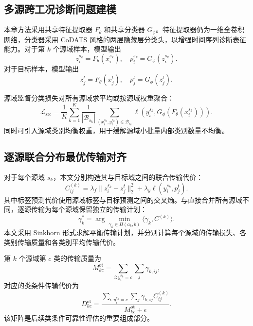\documentclass{seuthesis-2022}
\begin{document}
\subsection{多源跨工况诊断问题建模}

本章方法采用共享特征提取器 $F_\theta$ 和共享分类器 $G_\phi$。特征提取器仍为一维全卷积网络，分类器采用 CoDATS 风格的两层隐藏层分类头，以增强时间序列诊断表征能力。对于第 $k$ 个源域样本，模型输出
\begin{equation}
    z_i^{s_k}=F_\theta(x_i^{s_k}),\quad
    p_i^{s_k}=G_\phi(z_i^{s_k}).
\end{equation}
对于目标样本，模型输出
\begin{equation}
    z_j^t=F_\theta(x_j^t),\quad
    p_j^t=G_\phi(z_j^t).
\end{equation}

源域监督分类损失对所有源域求平均或按源域权重聚合：
\begin{equation}
    \mathcal{L}_{\mathrm{src}}
    =
    \frac{1}{K}
    \sum_{k=1}^{K}
    \frac{1}{|\mathcal{B}_{s_k}|}
    \sum_{(x_i^{s_k},y_i^{s_k})\in\mathcal{B}_{s_k}}
    \ell
    \left(
    y_i^{s_k},
    G_\phi(F_\theta(x_i^{s_k}))
    \right).
\end{equation}
同时可引入源域类别均衡权重，用于缓解源域小批量内部类别数量不均衡。

\subsection{逐源联合分布最优传输对齐}

对于每个源域 $s_k$，本文分别构造其与目标域之间的联合传输代价：
\begin{equation}
    C_{ij}^{(k)}
    =
    \lambda_f
    \|z_i^{s_k}-z_j^t\|_2^2
    +
    \lambda_y
    \ell
    \left(
    y_i^{s_k},
    p_j^t
    \right).
\end{equation}
其中标签预测代价使用源域标签与目标预测之间的交叉熵。与直接合并所有源域不同，逐源传输为每个源域保留独立的传输计划：
\begin{equation}
    \gamma_k^\ast
    =
    \arg\min_{\gamma_k\in\Pi(a_k,b)}
    \langle \gamma_k,C^{(k)}\rangle.
\end{equation}
本文采用 Sinkhorn 形式求解平衡传输计划，并分别计算每个源域的传输损失、各类别传输质量和各类别平均传输代价。

第 $k$ 个源域第 $c$ 类的传输质量为
\begin{equation}
    M_{kc}^{\mathrm{ot}}
    =
    \sum_{i:y_i^{s_k}=c}
    \sum_j
    \gamma_{k,ij},
\end{equation}
对应的类条件传输代价为
\begin{equation}
    D_{kc}^{\mathrm{ot}}
    =
    \frac{
    \sum_{i:y_i^{s_k}=c}
    \sum_j
    \gamma_{k,ij}C_{ij}^{(k)}
    }{
    M_{kc}^{\mathrm{ot}}+\epsilon
    }.
\end{equation}
该矩阵是后续类条件可靠性评估的重要组成部分。
\end{document}
